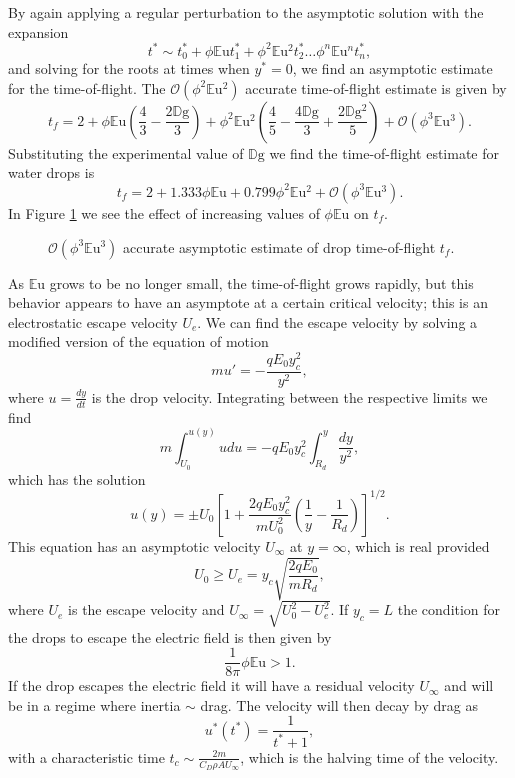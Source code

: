 \documentclass[12pt,a4paper,oneside]{book}
\begin{document}
By again applying a regular perturbation to the asymptotic solution with the expansion
\[ t^* \sim t^*_0 + \phi \mathbb{E}\mbox{u} t^*_1 + \phi^2 \mathbb{E}\mbox{u}^2 t^*_2 \ldots \phi^n \mathbb{E}\mbox{u}^n t^*_n  
,\]
and solving for the roots at times when $y^* = 0$, we find an asymptotic estimate for the time-of-flight. The $\mathcal{O}(\phi^2 \mathbb{E}\mbox{u}^2)$ accurate time-of-flight estimate is given by
\[t_f = 2 + \phi \mathbb{E}\mbox{u} \left(\frac{4}{3} - \frac{2 \mathbb{D}\mbox{g}}{3}\right) + \phi^2 \mathbb{E}\mbox{u}^{2} \left(\frac{4}{5} - \frac{4 \mathbb{D}\mbox{g}}{3} + \frac{2 \mathbb{D}\mbox{g}^{2}}{5}\right) + \mathcal{O}(\phi^3 \mathbb{E}\mbox{u}^3).\]
Substituting the experimental value of $\mathbb{D}\mbox{g}$ we find the time-of-flight estimate for water drops is
\begin{equation} \label{time_of_flight}
t_f = 2 + 1.333 \phi \mathbb{E}\mbox{u} + 0.799 \phi^2 \mathbb{E}\mbox{u}^{2} + \mathcal{O}(\phi^3 \mathbb{E}\mbox{u}^3). 
\end{equation} 
In Figure \ref{fig:drag} we see the effect of increasing values of $\phi \mathbb{E}\mbox{u}$ on $t_f$.
\begin{figure}[htb]
    \centering
    
    \caption{$\mathcal{O}(\phi^3 \mathbb{E}\mbox{u}^3)$ accurate asymptotic estimate of drop time-of-flight $t_f$.}
    \label{fig:drag}
\end{figure}
As $\mathbb{E}\mbox{u}$ grows to be no longer small, the time-of-flight grows rapidly, but this behavior appears to have an asymptote at a certain critical velocity; this is an electrostatic escape velocity $U_e$. We can find the escape velocity by solving a modified version of the equation of motion
\[ m u' = - \frac{q E_0 y_c^2}{y^2}, \]
where $u = \frac{d y}{d t}$ is the drop velocity. Integrating between the respective limits we find
\[m \int^{u(y)}_{U_0} u du = -q E_0 y_c^2 \int^y_{R_d} \frac{dy}{y^2} ,\]
which has the solution
\[ u(y) = \pm U_0 \left[1 + \frac{2q E_0 y_c^2}{m U_0^2} \left( \frac{1}{y} - \frac{1}{R_d} \right) \right]^{1/2}.
\]
This equation has an asymptotic velocity $U_{\infty}$ at $y = \infty$, which is real provided 
\[ U_0 \geq  U_e = y_c \sqrt{\frac{2 q E_0 }{m R_d}},
\]
where $U_e$ is the escape velocity and $U_{\infty} = \sqrt{U_0^2 - U_e^2}$. If $y_c=L$ the condition for the drops to escape the electric field is then given by
\begin{equation}\label{escape}
\frac{1}{8 \pi} \phi \mathbb{E}\mbox{u} > 1.
\end{equation}
If the drop escapes the electric field it will have a residual velocity $U_{\infty}$ and will be in a regime where inertia $\sim$ drag. The velocity will then decay by drag as
\[
u^*(t^*) = \frac{1}{t^* + 1},
\]
with a characteristic time $t_c \sim \frac{2 m}{C_D \rho A U_{\infty}}$, which is the halving time of the velocity.
\end{document}
